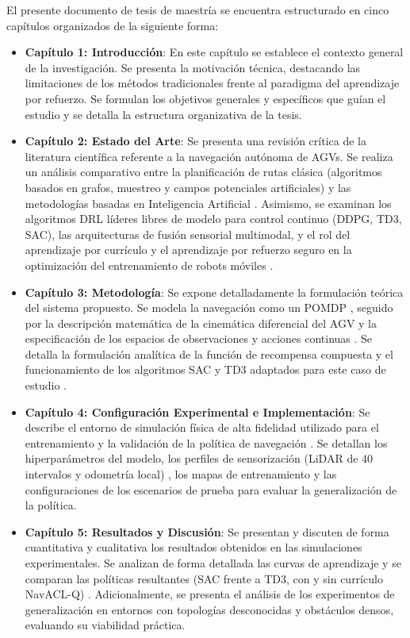 El presente documento de tesis de maestría se encuentra estructurado en cinco capítulos organizados de la siguiente forma:

\begin{itemize}
    \item \textbf{Capítulo 1: Introducción}: En este capítulo se establece el contexto general de la investigación. Se presenta la motivación técnica, destacando las limitaciones de los métodos tradicionales frente al paradigma del aprendizaje por refuerzo. Se formulan los objetivos generales y específicos que guían el estudio y se detalla la estructura organizativa de la tesis.
    \item \textbf{Capítulo 2: Estado del Arte}: Se presenta una revisión crítica de la literatura científica referente a la navegación autónoma de AGVs. Se realiza un análisis comparativo entre la planificación de rutas clásica (algoritmos basados en grafos, muestreo y campos potenciales artificiales) y las metodologías basadas en Inteligencia Artificial \cite{Sivashangaran2023, Perez2018}. Asimismo, se examinan los algoritmos DRL líderes libres de modelo para control continuo (DDPG, TD3, SAC), las arquitecturas de fusión sensorial multimodal, y el rol del aprendizaje por currículo y el aprendizaje por refuerzo seguro en la optimización del entrenamiento de robots móviles \cite{Xue2022, Guo2025}.
    \item \textbf{Capítulo 3: Metodología}: Se expone detalladamente la formulación teórica del sistema propuesto. Se modela la navegación como un POMDP \cite{Xue2022, Ge2024}, seguido por la descripción matemática de la cinemática diferencial del AGV y la especificación de los espacios de observaciones y acciones continuas \cite{Guo2025}. Se detalla la formulación analítica de la función de recompensa compuesta y el funcionamiento de los algoritmos SAC y TD3 adaptados para este caso de estudio \cite{Sivashangaran2023, Xue2022, Guo2025}.
    \item \textbf{Capítulo 4: Configuración Experimental e Implementación}: Se describe el entorno de simulación física de alta fidelidad utilizado para el entrenamiento y la validación de la política de navegación \cite{Sivashangaran2023, Xue2022}. Se detallan los hiperparámetros del modelo, los perfiles de sensorización (LiDAR de 40 intervalos y odometría local) \cite{Guo2025}, los mapas de entrenamiento y las configuraciones de los escenarios de prueba para evaluar la generalización de la política.
    \item \textbf{Capítulo 5: Resultados y Discusión}: Se presentan y discuten de forma cuantitativa y cualitativa los resultados obtenidos en las simulaciones experimentales. Se analizan de forma detallada las curvas de aprendizaje y se comparan las políticas resultantes (SAC frente a TD3, con y sin currículo NavACL-Q) \cite{Xue2022, Guo2025}. Adicionalmente, se presenta el análisis de los experimentos de generalización en entornos con topologías desconocidas y obstáculos densos, evaluando su viabilidad práctica.

\end{itemize}
